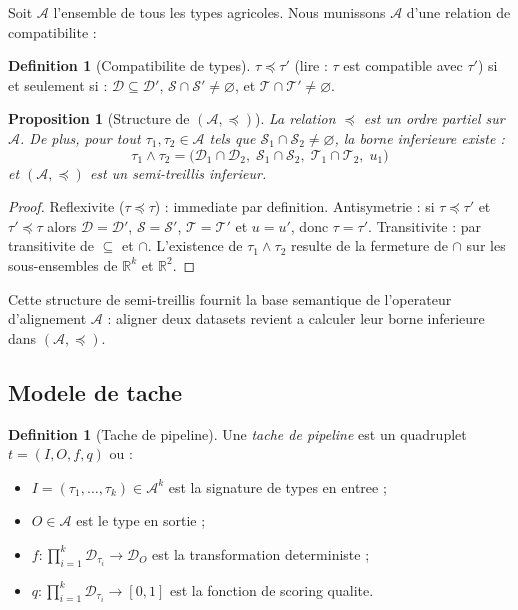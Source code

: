 \documentclass[12pt,a4paper]{article}
\theoremstyle{plain}
\newtheorem{proposition}[theorem]{Proposition}
\theoremstyle{definition}
\newtheorem{definition}[theorem]{Definition}
\theoremstyle{remark}
\newcommand{\R}{\mathbb{R}}
\begin{document}
	Soit $\mathcal{A}$ l'ensemble de tous les types agricoles.
	Nous munissons $\mathcal{A}$ d'une relation de compatibilite :
	
	\begin{definition}[Compatibilite de types]
		\label{def:compat}
		$\tau \preceq \tau'$ (lire : $\tau$ est compatible avec $\tau'$) si et
		seulement si :
		$\mathcal{D} \subseteq \mathcal{D}'$,
		$\mathcal{S} \cap \mathcal{S}' \neq \varnothing$, et
		$\mathcal{T} \cap \mathcal{T}' \neq \varnothing$.
	\end{definition}
	
	\begin{proposition}[Structure de $(\mathcal{A}, \preceq)$]
		\label{prop:lattice}
		La relation $\preceq$ est un ordre partiel sur $\mathcal{A}$.
		De plus, pour tout $\tau_1, \tau_2 \in \mathcal{A}$ tels que
		$\mathcal{S}_1 \cap \mathcal{S}_2 \neq \varnothing$, la borne inferieure
		existe :
		\[
		\tau_1 \wedge \tau_2 = \bigl(\mathcal{D}_1 \cap \mathcal{D}_2,\;
		\mathcal{S}_1 \cap \mathcal{S}_2,\;
		\mathcal{T}_1 \cap \mathcal{T}_2,\;
		u_1\bigr)
		\]
		et $(\mathcal{A}, \preceq)$ est un semi-treillis inferieur.
	\end{proposition}
	
	\begin{proof}
		Reflexivite ($\tau \preceq \tau$) : immediate par definition.
		Antisymetrie : si $\tau \preceq \tau'$ et $\tau' \preceq \tau$ alors
		$\mathcal{D} = \mathcal{D}'$, $\mathcal{S} = \mathcal{S}'$,
		$\mathcal{T} = \mathcal{T}'$ et $u=u'$, donc $\tau = \tau'$.
		Transitivite : par transitivite de $\subseteq$ et $\cap$.
		L'existence de $\tau_1 \wedge \tau_2$ resulte de la fermeture de
		$\cap$ sur les sous-ensembles de $\R^k$ et $\R^2$.
	\end{proof}
	
	Cette structure de semi-treillis fournit la base semantique de l'operateur
	d'alignement $\mathcal{A}$ : aligner deux datasets revient a calculer
	leur borne inferieure dans $(\mathcal{A},\preceq)$.
	
	\subsection{Modele de tache}
	\label{subsec:task}
	
	\begin{definition}[Tache de pipeline]
		\label{def:task}
		Une \emph{tache de pipeline} est un quadruplet $t = (I, O, f, q)$ ou :
		\begin{itemize}[noitemsep]
			\item $I = (\tau_1,\ldots,\tau_k) \in \mathcal{A}^k$ est la signature
			de types en entree ;
			\item $O \in \mathcal{A}$ est le type en sortie ;
			\item $f : \prod_{i=1}^k \mathcal{D}_{\tau_i} \to \mathcal{D}_O$ est
			la transformation deterministe ;
			\item $q : \prod_{i=1}^k \mathcal{D}_{\tau_i} \to [0,1]$ est la
			fonction de scoring qualite.
		\end{itemize}
	\end{definition}
	
\end{document}
